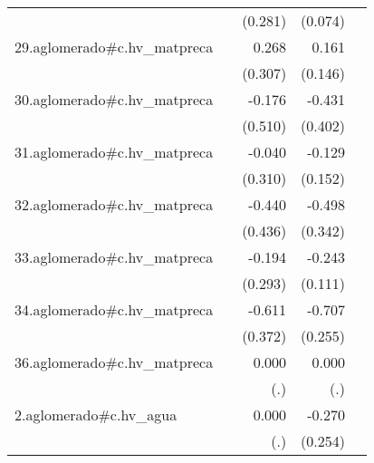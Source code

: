 {\begin{longtable}{l*{4}{D{.}{.}{-1}}}
            &                     &     (0.281)         &     (0.074)         &                     \\
\addlinespace
29.aglomerado#c.hv\_matpreca&                     &       0.268         &       0.161         &                     \\
            &                     &     (0.307)         &     (0.146)         &                     \\
\addlinespace
30.aglomerado#c.hv\_matpreca&                     &      -0.176         &      -0.431         &                     \\
            &                     &     (0.510)         &     (0.402)         &                     \\
\addlinespace
31.aglomerado#c.hv\_matpreca&                     &      -0.040         &      -0.129         &                     \\
            &                     &     (0.310)         &     (0.152)         &                     \\
\addlinespace
32.aglomerado#c.hv\_matpreca&                     &      -0.440         &      -0.498         &                     \\
            &                     &     (0.436)         &     (0.342)         &                     \\
\addlinespace
33.aglomerado#c.hv\_matpreca&                     &      -0.194         &      -0.243\sym{*}  &                     \\
            &                     &     (0.293)         &     (0.111)         &                     \\
\addlinespace
34.aglomerado#c.hv\_matpreca&                     &      -0.611         &      -0.707\sym{**} &                     \\
            &                     &     (0.372)         &     (0.255)         &                     \\
\addlinespace
36.aglomerado#c.hv\_matpreca&                     &       0.000         &       0.000         &                     \\
            &                     &         (.)         &         (.)         &                     \\
\addlinespace
2.aglomerado#c.hv\_agua&                     &       0.000         &      -0.270         &                     \\
            &                     &         (.)         &     (0.254)         &                     \\

\end{longtable}}
